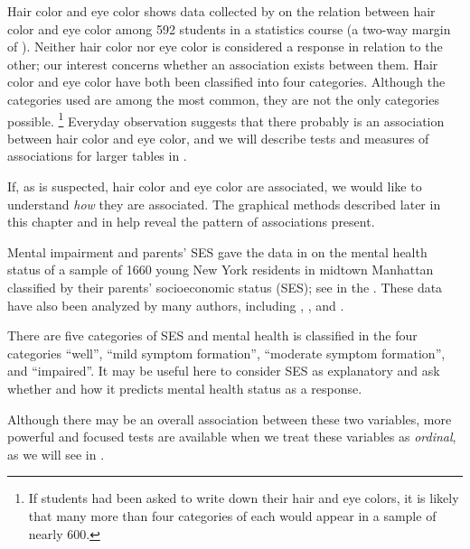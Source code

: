 \documentclass[11pt]{book}\usepackage[]{graphicx}\usepackage[]{color}
\begin{document}
\begin{Example}[haireye1]{Hair color and eye color}
 shows data collected by
\citet{Snee:74}
on the relation between hair color and eye color among 592
students in a statistics course
(a two-way margin of ).  Neither hair color nor eye color
is considered a response in relation to the other;  our interest concerns
whether an association exists between them.
Hair color and eye color have both been classified
into four categories.  Although the categories used are among the most
common, they are not the only categories possible.%
\footnote{If students had been asked to write down their hair and eye
colors, it is likely that many more than four categories of each
would appear in a sample of nearly 600.}
Everyday observation suggests that there probably is an association
between hair color and eye color, and we will describe tests
and measures of associations for larger tables in
.

\end{Example}

If, as is suspected, hair color and eye color are associated,
we would like to understand \emph{how} they are associated.
The graphical methods described later in this chapter 
and in  help
reveal the pattern of associations present.


\begin{Example}[mental1]{Mental impairment and parents' SES}
\citet[p. 289]{Srole-etal:78} gave the data 
in  on the mental
health status of a sample of 1660 young New York residents in midtown Manhattan
classified by their parents' socioeconomic status (SES);
see  in the .
These data have also been analyzed by many authors, including
\citet[ \S 8.5.2]{Agresti:90},
\citet{Goodman:79}, and
\citet[p. 375]{Haberman:79}. 

There are five categories of SES and mental health is classified
in the four categories ``well'', ``mild symptom formation'',
``moderate symptom formation'', and ``impaired''.
It may be useful here to consider SES as explanatory
and ask whether and how it predicts mental health status as
a response.

Although there may be an overall association between these two
variables, more powerful and focused tests are available
when we treat these variables as \emph{ordinal}, as we will see in
.
\end{Example}
\end{document}
